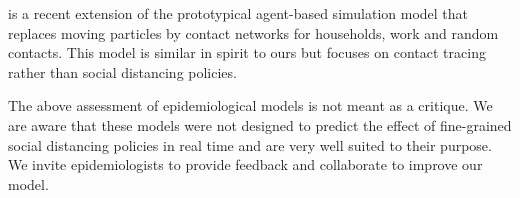 \citet{Hinch2020} is a recent extension of the prototypical agent-based simulation model
that replaces moving particles by contact networks for households, work and random
contacts. This model is similar in spirit to ours but focuses on contact tracing rather
than social distancing policies.

The above assessment of epidemiological models is not meant as a critique. We are aware
that these models were not designed to predict the effect of fine-grained social
distancing policies in real time and are very well suited to their purpose. We invite
epidemiologists to provide feedback and collaborate to improve our model.
